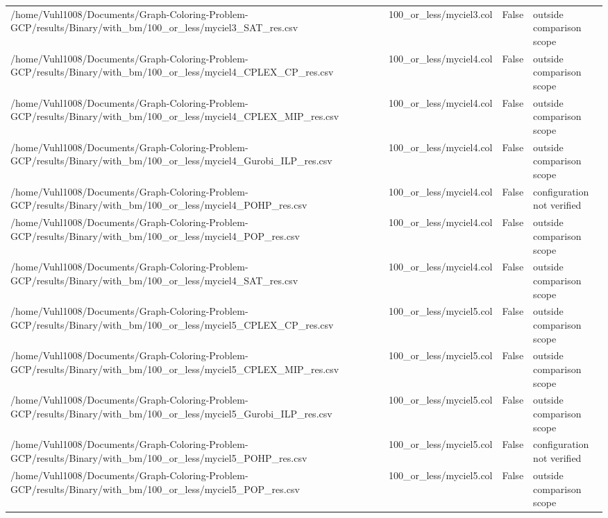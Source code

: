 \begin{table}[htbp]
\begin{tabular}{llll}
/home/Vuhl1008/Documents/Graph-Coloring-Problem-GCP/results/Binary/with\_bm/100\_or\_less/myciel3\_SAT\_res.csv & 100\_or\_less/myciel3.col & False & outside comparison scope \\
/home/Vuhl1008/Documents/Graph-Coloring-Problem-GCP/results/Binary/with\_bm/100\_or\_less/myciel4\_CPLEX\_CP\_res.csv & 100\_or\_less/myciel4.col & False & outside comparison scope \\
/home/Vuhl1008/Documents/Graph-Coloring-Problem-GCP/results/Binary/with\_bm/100\_or\_less/myciel4\_CPLEX\_MIP\_res.csv & 100\_or\_less/myciel4.col & False & outside comparison scope \\
/home/Vuhl1008/Documents/Graph-Coloring-Problem-GCP/results/Binary/with\_bm/100\_or\_less/myciel4\_Gurobi\_ILP\_res.csv & 100\_or\_less/myciel4.col & False & outside comparison scope \\
/home/Vuhl1008/Documents/Graph-Coloring-Problem-GCP/results/Binary/with\_bm/100\_or\_less/myciel4\_POHP\_res.csv & 100\_or\_less/myciel4.col & False & configuration not verified \\
/home/Vuhl1008/Documents/Graph-Coloring-Problem-GCP/results/Binary/with\_bm/100\_or\_less/myciel4\_POP\_res.csv & 100\_or\_less/myciel4.col & False & outside comparison scope \\
/home/Vuhl1008/Documents/Graph-Coloring-Problem-GCP/results/Binary/with\_bm/100\_or\_less/myciel4\_SAT\_res.csv & 100\_or\_less/myciel4.col & False & outside comparison scope \\
/home/Vuhl1008/Documents/Graph-Coloring-Problem-GCP/results/Binary/with\_bm/100\_or\_less/myciel5\_CPLEX\_CP\_res.csv & 100\_or\_less/myciel5.col & False & outside comparison scope \\
/home/Vuhl1008/Documents/Graph-Coloring-Problem-GCP/results/Binary/with\_bm/100\_or\_less/myciel5\_CPLEX\_MIP\_res.csv & 100\_or\_less/myciel5.col & False & outside comparison scope \\
/home/Vuhl1008/Documents/Graph-Coloring-Problem-GCP/results/Binary/with\_bm/100\_or\_less/myciel5\_Gurobi\_ILP\_res.csv & 100\_or\_less/myciel5.col & False & outside comparison scope \\
/home/Vuhl1008/Documents/Graph-Coloring-Problem-GCP/results/Binary/with\_bm/100\_or\_less/myciel5\_POHP\_res.csv & 100\_or\_less/myciel5.col & False & configuration not verified \\
/home/Vuhl1008/Documents/Graph-Coloring-Problem-GCP/results/Binary/with\_bm/100\_or\_less/myciel5\_POP\_res.csv & 100\_or\_less/myciel5.col & False & outside comparison scope \\

\end{tabular}
\end{table}

